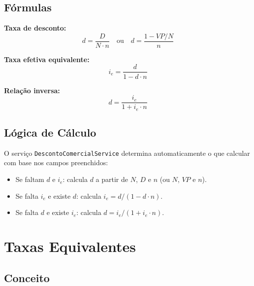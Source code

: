 \documentclass[12pt,a4paper]{article}
\begin{document}
\subsection{Fórmulas}

\begin{tcolorbox}[colback=white,colframe=teal600,title=Fórmulas --- Desconto Comercial]

\textbf{Taxa de desconto:}
\begin{equation}
  d = \frac{D}{N \cdot n} \quad \text{ou} \quad d = \frac{1 - VP/N}{n}
\end{equation}

\textbf{Taxa efetiva equivalente:}
\begin{equation}
  i_e = \frac{d}{1 - d \cdot n}
\end{equation}

\textbf{Relação inversa:}
\begin{equation}
  d = \frac{i_e}{1 + i_e \cdot n}
\end{equation}

\end{tcolorbox}

\subsection{Lógica de Cálculo}

O serviço \texttt{DescontoComercialService} determina automaticamente o que calcular com base nos campos preenchidos:

\begin{itemize}
  \item Se faltam $d$ e $i_e$: calcula $d$ a partir de $N$, $D$ e $n$ (ou $N$, $VP$ e $n$).
  \item Se falta $i_e$ e existe $d$: calcula $i_e = d / (1 - d \cdot n)$.
  \item Se falta $d$ e existe $i_e$: calcula $d = i_e / (1 + i_e \cdot n)$.
\end{itemize}

\section{Taxas Equivalentes}
\label{sec:equivalente}

\subsection{Conceito}
\end{document}
